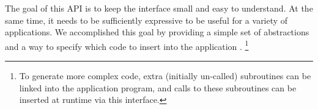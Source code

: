 The goal of this API is to keep the interface small and easy to understand.  At the same time, it needs to be sufficiently expressive to be useful for a variety of applications.  We accomplished this goal by providing a simple set of abstractions and a way to specify which code to insert into the application . \footnote{To generate more complex code, extra (initially un-called) subroutines can be linked into the application program, and calls to these subroutines can be inserted at runtime via this interface.
}

\pagebreak
